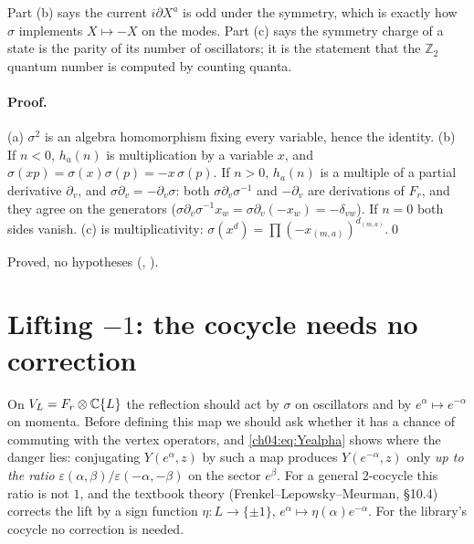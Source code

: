 \begin{physics}
Part (b) says the current $i\partial X^a$ is odd under the symmetry, which is exactly how $\sigma$ implements $X\mapsto-X$ on the modes. Part (c) says the symmetry charge of a state is the parity of its number of oscillators; it is the statement that the $\mathbb Z_2$ quantum number is computed by counting quanta.
\end{physics}

\paragraph{Proof.} (a) $\sigma^2$ is an algebra homomorphism fixing every variable, hence the
identity. (b) If $n<0$, $h_a(n)$ is multiplication by a variable $x$, and
$\sigma(xp)=\sigma(x)\sigma(p)=-x\,\sigma(p)$. If $n>0$, $h_a(n)$ is a multiple of a partial
derivative $\partial_v$, and $\sigma\partial_v=-\partial_v\sigma$: both $\sigma\partial_v\sigma^{-1}$
and $-\partial_v$ are derivations of $F_r$, and they agree on the generators
($\sigma\partial_v\sigma^{-1}x_w=\sigma\partial_v(-x_w)=-\delta_{vw}$). If $n=0$ both sides vanish.
(c) is multiplicativity: $\sigma(x^d)=\prod(-x_{(m,a)})^{d_{(m,a)}}$.\qed

\begin{status}
Proved, no hypotheses (,
).
\end{status}

\section{Lifting \texorpdfstring{$-1$}{-1}: the cocycle needs no correction}\label{ch04:sec:theta}

On $V_L=F_r\otimes{\mathbb{C}}\{L\}$ the reflection should act by $\sigma$ on oscillators and by
$e^\alpha\mapsto e^{-\alpha}$ on momenta. Before defining this map we should ask whether it has a
chance of commuting with the vertex operators, and \eqref{ch04:eq:Yealpha} shows where the danger
lies: conjugating $Y(e^\alpha,z)$ by such a map produces $Y(e^{-\alpha},z)$ only \emph{up to the
ratio} $\varepsilon(\alpha,\beta)/\varepsilon(-\alpha,-\beta)$ on the sector $e^{\beta}$. For a general
$2$-cocycle this ratio is not $1$, and the textbook theory (Frenkel--Lepowsky--Meurman, \S10.4)
corrects the lift by a sign function $\eta:L\to\{\pm1\}$, $e^\alpha\mapsto\eta(\alpha)e^{-\alpha}$. For
the library's cocycle no correction is needed.

